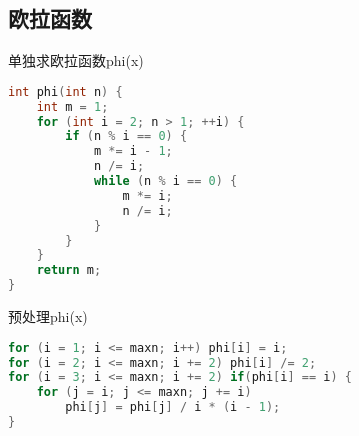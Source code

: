 \subsection{欧拉函数}
单独求欧拉函数phi(x)
    \begin{lstlisting}[language=c++]
int phi(int n) {
	int m = 1;
	for (int i = 2; n > 1; ++i) {
		if (n % i == 0) {
			m *= i - 1;
			n /= i;
			while (n % i == 0) {
				m *= i;
				n /= i;
			}
		}
	}
	return m;
}
    \end{lstlisting}
预处理phi(x)
    \begin{lstlisting}[language=c++]
for (i = 1; i <= maxn; i++) phi[i] = i;
for (i = 2; i <= maxn; i += 2) phi[i] /= 2;
for (i = 3; i <= maxn; i += 2) if(phi[i] == i) {
    for (j = i; j <= maxn; j += i)
        phi[j] = phi[j] / i * (i - 1);
}
    \end{lstlisting}

